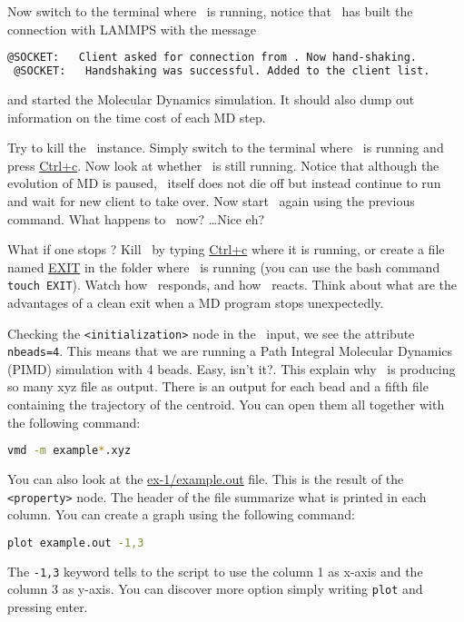 \documentclass{article}
\begin{document}
\begin{Exercise}[label={i-pi},title={Molecular Dynamics: a client/server approach}]
\Question Now switch to the terminal where \ipi\ is running, notice
that \ipi\ has built the connection with LAMMPS with the message
\begin{lstlisting}[language=sh]
 @SOCKET:   Client asked for connection from . Now hand-shaking.
 @SOCKET:   Handshaking was successful. Added to the client list.
\end{lstlisting}
and started the Molecular Dynamics simulation.
It should also dump out information on the time cost of each MD step.

\Question
Try to kill the \pwx\ instance.  Simply switch to the
terminal where \pwx\ is running and press \url{Ctrl+c}.  Now look at
whether \ipi\ is still running.  Notice that although the evolution of
MD is paused, \ipi\ itself does not die off but instead continue to
run and wait for new client to take over.  Now start \pwx\ again using
the previous command.
What happens to \ipi\ now?  \ldots Nice eh? 


\Question 
What if one stops \ipi ?  Kill \ipi\ by typing \url{Ctrl+c}
where it is running, or create a file named \url{EXIT} in the folder
where \ipi\ is running (you can use the bash command \texttt{touch
  EXIT}).  Watch how \ipi\ responds, and how \pwx\ reacts.  Think
about what are the advantages of a clean exit when a MD program stops
unexpectedly.


\Question
Checking the \texttt{<initialization>} node in the \ipi\ input, we see
the attribute \texttt{nbeads=4}. This means that we are running a Path
Integral Molecular Dynamics (PIMD) simulation with 4 beads. Easy, isn't it?. 
This explain why \ipi\ is producing so many xyz file as output. There
is an output for each bead and a fifth file containing the trajectory
of the centroid. You can open them all together with the following
command:
\begin{lstlisting}[language=bash]
vmd -m example*.xyz
\end{lstlisting}
You can also look at the \url{ex-1/example.out} file. This is the
result of the \texttt{<property>} node. The header of the file
summarize what is printed in each column. You can create a graph using
the following command:
\begin{lstlisting}[language=bash]
plot example.out -1,3
\end{lstlisting}
The \texttt{-1,3} keyword tells to the script to use the column 1 as
x-axis and the column 3 as y-axis. You can discover more option simply
writing \texttt{plot} and pressing enter.
\end{Exercise}
\vspace{1em}
\end{document}
